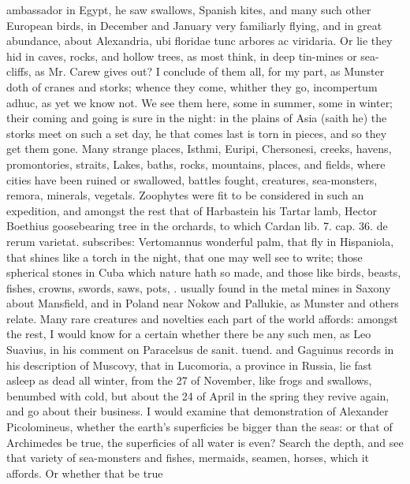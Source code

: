 {ambassador in Egypt, he saw swallows, Spanish kites, and many
such other European birds, in December and January very familiarly
flying, and in great abundance, about Alexandria, ubi floridae tunc
arbores ac viridaria. Or lie they hid in caves, rocks, and hollow
trees, as most think, in deep tin-mines or sea-cliffs, as Mr.
Carew gives out? I conclude of them all, for my part, as Munster
doth of cranes and storks; whence they come, whither they go,
incompertum adhuc, as yet we know not. We see them here, some in
summer, some in winter; their coming and going is sure in the night: in
the plains of Asia (saith he) the storks meet on such a set day, he
that comes last is torn in pieces, and so they get them gone. Many
strange places, Isthmi, Euripi, Chersonesi, creeks, havens,
promontories, straits, Lakes, baths, rocks, mountains, places, and
fields, where cities have been ruined or swallowed, battles fought,
creatures, sea-monsters, remora, \etc{} minerals, vegetals. Zoophytes were
fit to be considered in such an expedition, and amongst the rest that
of Harbastein his Tartar lamb, Hector Boethius goosebearing
tree in the orchards, to which Cardan lib. 7. cap. 36. de rerum
varietat. subscribes: Vertomannus wonderful palm, that  fly
in Hispaniola, that shines like a torch in the night, that one may well
see to write; those spherical stones in Cuba which nature hath so made,
and those like birds, beasts, fishes, crowns, swords, saws, pots, \etc{}.
usually found in the metal mines in Saxony about Mansfield, and in
Poland near Nokow and Pallukie, as Munster and others relate.
Many rare creatures and novelties each part of the world affords:
amongst the rest, I would know for a certain whether there be any such
men, as Leo Suavius, in his comment on Paracelsus de sanit. tuend. and
Gaguinus records in his description of Muscovy, that in
Lucomoria, a province in Russia, lie fast asleep as dead all winter,
from the 27 of November, like frogs and swallows, benumbed with cold,
but about the 24 of April in the spring they revive again, and go about
their business. I would examine that demonstration of Alexander
Picolomineus, whether the earth's superficies be bigger than the seas:
or that of Archimedes be true, the superficies of all water is even?
Search the depth, and see that variety of sea-monsters and fishes,
mermaids, seamen, horses, \etc{} which it affords. Or whether that be true
}
